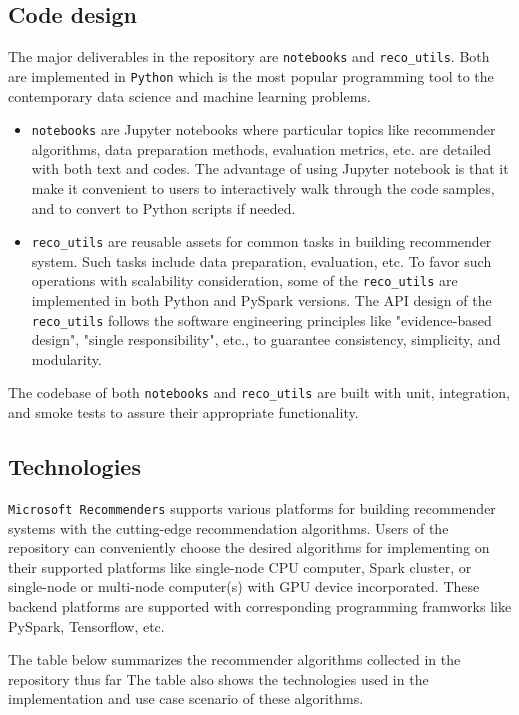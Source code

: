 \documentclass[twoside,11pt]{article}
\begin{document}
\subsection{Code design}
The major deliverables in the repository are \verb|notebooks| and \verb|reco_utils|. Both are implemented in \verb|Python| which is the most popular programming tool to the contemporary data science and machine learning problems.

\begin{itemize}
 \item \verb|notebooks| are Jupyter notebooks where particular topics like recommender algorithms, data preparation methods, evaluation metrics, etc. are detailed with both text and codes. The advantage of using Jupyter notebook is that it make it convenient to users to interactively walk through the code samples, and to convert to Python scripts if needed.
 \item \verb|reco_utils| are reusable assets for common tasks in building recommender system. Such tasks include data preparation, evaluation, etc. To favor such operations with scalability consideration, some of the \verb|reco_utils| are implemented in both Python and PySpark versions. The API design of the \verb|reco_utils| follows the software engineering principles like "evidence-based design", "single responsibility", etc., to guarantee consistency, simplicity, and modularity.
\end{itemize}
The codebase of both \verb|notebooks| and \verb|reco_utils| are built with unit, integration, and smoke tests to assure their appropriate functionality.

\subsection{Technologies}
\verb|Microsoft Recommenders| supports various platforms for building recommender systems with the cutting-edge recommendation algorithms. Users of the repository can conveniently choose the desired algorithms for implementing on their supported platforms like single-node CPU computer, Spark cluster, or single-node or multi-node computer(s) with GPU device incorporated. These backend platforms are supported with corresponding programming framworks like PySpark, Tensorflow, etc. \citep{abadi2016tensorflow}

 The table below summarizes the recommender algorithms collected in the repository thus far \citep{ke2017lightgbm,wang2018dkn,lian2018xdeepfm,howard2018fastai,he2017neural,salakhutdinov2007restricted,cheng2016wide,diev2015sar,koren2009matrix} The table also shows the technologies used in the implementation and use case scenario of these algorithms. 
\end{document}
